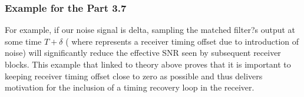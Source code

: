 \subsubsection{Example for the Part 3.7}

For example, if our noise signal is delta, sampling the matched filter?s output at some time $T+\delta$ ( where  represents a receiver timing offset due to introduction of noise) will significantly reduce the effective SNR seen by subsequent receiver blocks. This example that linked to theory above proves that it is important to keeping receiver timing offset close to zero as possible and thus delivers motivation for the inclusion of a timing recovery loop in the receiver.


